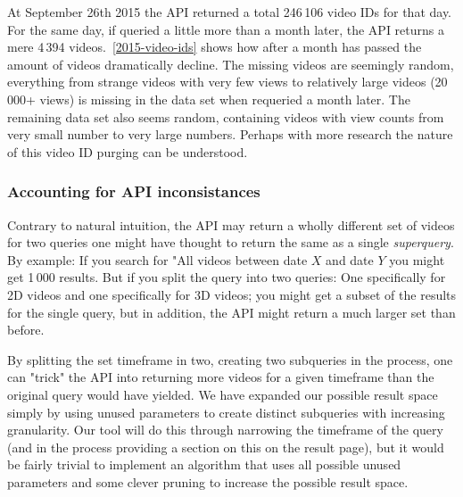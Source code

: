 At September 26th 2015 the API returned a total 246\,106 video IDs for that day.
For the same day, if queried a little more than a month later, the API returns
a mere 4\,394 videos.~\cref{2015-video-ids} shows how after a month has passed 
the amount of videos dramatically decline. The missing videos are seemingly 
random, everything from strange videos with very few views to relatively large 
videos (20\,000+ views) is missing in the data set when requeried a month later. 
The remaining data set also seems random, containing videos with view counts 
from very small number to very large numbers. Perhaps with more research the
nature of this video ID purging can be understood.

\subsubsection{Accounting for API inconsistances}
Contrary to natural intuition, the API may return a wholly different set of
videos for two queries one might have thought to return the same as a single
\textit{superquery}. By example: If you search for "All videos between date
$X$ and date $Y$ you might get 1\,000 results. But if you split the query into
two queries: One specifically for 2D videos and one specifically for 3D videos;
you might get a subset of the results for the single query, but in addition,
the API might return a much larger set than before.

By splitting the set timeframe in two, creating two subqueries in the process,
one can "trick"
the API into returning more videos for a given
timeframe than the original query would have yielded. We have expanded our
possible result space simply by using unused parameters to create distinct
subqueries with increasing granularity.
Our tool will do this through narrowing the timeframe of the query (and
in the process providing a section on this on the result page), but
it would be fairly trivial to implement an algorithm that uses all possible
unused parameters and some clever pruning to increase the possible result space.

